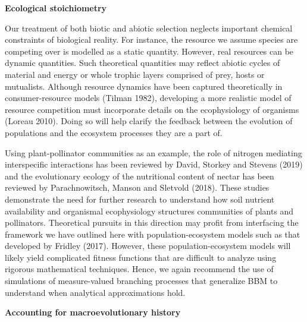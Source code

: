 \documentclass[]{article}
\begin{document}
\textbf{Ecological stoichiometry}

Our treatment of both biotic and abiotic selection neglects important
chemical constraints of biological reality. For instance, the resource
we assume species are competing over is modelled as a static quantity.
However, real resources can be dynamic quantities. Such theoretical
quantities may reflect abiotic cycles of material and energy or whole
trophic layers comprised of prey, hosts or mutualists. Although resource
dynamics have been captured theoretically in consumer-resource models
(Tilman 1982), developing a more realistic model of resource competition
must incorporate details on the ecophysiology of organisms (Loreau
2010). Doing so will help clarify the feedback between the evolution of
populations and the ecosystem processes they are a part of.

Using plant-pollinator communities as an example, the role of nitrogen
mediating interspecific interactions has been reviewed by David, Storkey
and Stevens (2019) and the evolutionary ecology of the nutritional
content of nectar has been reviewed by Parachnowitsch, Manson and
Sletvold (2018). These studies demonstrate the need for further research
to understand how soil nutrient availability and organismal
ecophysiology structures communities of plants and pollinators.
Theoretical pursuits in this direction may profit from interfacing the
framework we have outlined here with population-ecosystem models such as
that developed by Fridley (2017). However, these population-ecosystem
models will likely yield complicated fitness functions that are
difficult to analyze using rigorous mathematical techniques. Hence, we
again recommend the use of simulations of measure-valued branching
processes that generalize BBM to understand when analytical
approximations hold.

\textbf{Accounting for macroevolutionary history}
\end{document}
